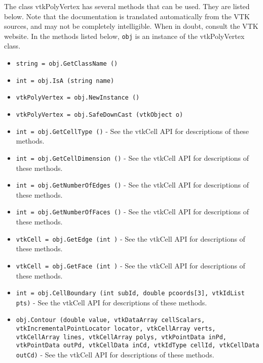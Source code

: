 The class vtkPolyVertex has several methods that can be used.
  They are listed below.
Note that the documentation is translated automatically from the VTK sources,
and may not be completely intelligible.  When in doubt, consult the VTK website.
In the methods listed below, \verb|obj| is an instance of the vtkPolyVertex class.
\begin{itemize}
\item  \verb|string = obj.GetClassName ()|

\item  \verb|int = obj.IsA (string name)|

\item  \verb|vtkPolyVertex = obj.NewInstance ()|

\item  \verb|vtkPolyVertex = obj.SafeDownCast (vtkObject o)|

\item  \verb|int = obj.GetCellType ()| -  See the vtkCell API for descriptions of these methods.

\item  \verb|int = obj.GetCellDimension ()| -  See the vtkCell API for descriptions of these methods.

\item  \verb|int = obj.GetNumberOfEdges ()| -  See the vtkCell API for descriptions of these methods.

\item  \verb|int = obj.GetNumberOfFaces ()| -  See the vtkCell API for descriptions of these methods.

\item  \verb|vtkCell = obj.GetEdge (int )| -  See the vtkCell API for descriptions of these methods.

\item  \verb|vtkCell = obj.GetFace (int )| -  See the vtkCell API for descriptions of these methods.

\item  \verb|int = obj.CellBoundary (int subId, double pcoords[3], vtkIdList pts)| -  See the vtkCell API for descriptions of these methods.

\item  \verb|obj.Contour (double value, vtkDataArray cellScalars, vtkIncrementalPointLocator locator, vtkCellArray verts, vtkCellArray lines, vtkCellArray polys, vtkPointData inPd, vtkPointData outPd, vtkCellData inCd, vtkIdType cellId, vtkCellData outCd)| -  See the vtkCell API for descriptions of these methods.


\end{itemize}
